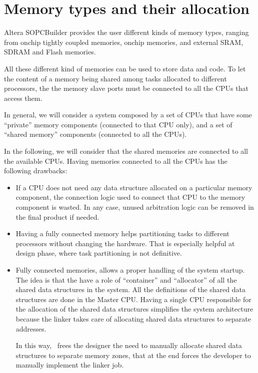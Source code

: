 \section{Memory types and their allocation}
\label{sec:memories}

Altera SOPCBuilder provides the user different kinds of memory types,
ranging from onchip tightly coupled memories, onchip memories, and
external SRAM, SDRAM and Flash memories.

All these different kind of memories can be used to store data and
code. To let the content of a memory being shared among tasks allocated to
different processors, the the memory slave ports must be connected to
all the CPUs that access them.

In general, we will consider a system composed by a set of CPUs that
have some ``private'' memory components (connected to that CPU only),
and a set of ``shared memory'' components (connected to all the CPUs).

In the following, we will consider that the shared memories are
connected to all the available CPUs. Having memories connected to all
the CPUs has the following drawbacks:

\begin{itemize}
\item If a CPU does not need any data structure allocated on a
  particular memory component, the connection logic used to connect
  that CPU to the memory component is wasted. In any case,
  unused arbitration logic can be removed in the final product if
  needed.

\item Having a fully connected memory helps partitioning tasks to
  different processors without changing the hardware. That is
  especially helpful at design phase, where task partitioning is not
  definitive.

\item Fully connected memories, allows a proper handling of the system
  startup. The idea is that the  have a
  role of ``container'' and ``allocator'' of all the shared data
  structures in the system. All the definitions of the shared data
  structures are done in the Master CPU. Having a single CPU
  responsible for the allocation of the shared data structures
  simplifies the system architecture because the linker takes care of
  allocating shared data structures to separate addresses.

  In this way, \ee\ frees the designer the need to manually allocate
  shared data structures to separate memory zones, that at the end
  forces the developer to manually implement the linker job.
\end{itemize}

